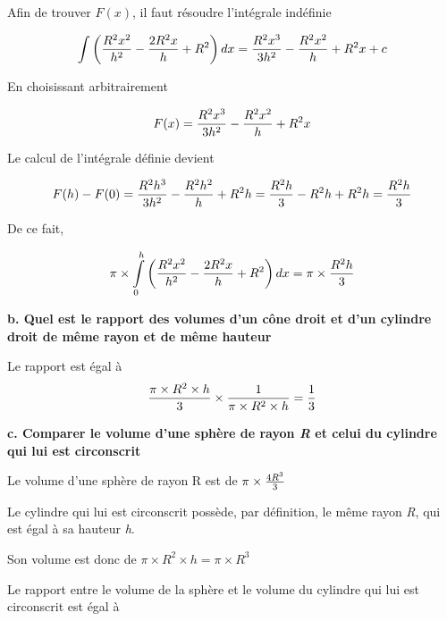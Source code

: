 \documentclass[10pt]{article}
\begin{document}
Afin de trouver $F(x)$, il faut résoudre l'intégrale indéfinie\vspace{0.2cm}

$$\int\left({R^2x^2\over{h^2}}-{2R^2x\over{h}}+R^2\right)dx={R^2x^3\over{3}h^2}-{R^2x^2\over{h}}+R^2x+c$$\vspace{0.01cm}

En choisissant arbitrairement

$$F(x)={R^2x^3\over{3}h^2}-{R^2x^2\over{h}}+R^2x$$\vspace{0.01cm}

Le calcul de l'intégrale définie devient\vspace{0.2cm}

$$F(h)-F(0)={R^2h^3\over{3}h^2}-{R^2h^2\over{h}}+R^2h={R^2h\over{3}}-R^2h+R^2h={R^2h\over{3}}$$\vspace{0.01cm}

De ce fait,

$$\pi\times\int\limits_0^h\left({R^2x^2\over{h^2}}-{2R^2x\over{h}}+R^2\right)dx=\pi\times{R^2h\over{3}}$$


\newpage
\flushleft \textbf{b. Quel est le rapport des volumes d'un cône droit et d'un cylindre droit de même rayon et de même hauteur}\vspace{0.5cm}

Le rapport est égal à $$\displaystyle{\pi \times R^2 \times h \over{3}} \times {1\over{\pi \times R^2 \times h}}={1\over{3}}$$

\flushleft \textbf{c. Comparer le volume d'une sphère de rayon \textit{R} et celui du cylindre qui lui est circonscrit}\vspace{0.5cm}

Le volume d'une sphère de rayon R est de $\pi\times{4R^3\over{3}}$\vspace{0.5cm}

Le cylindre qui lui est circonscrit possède, par définition, le même rayon \textit{R}, qui est égal à sa hauteur \textit{h}.\vspace{0.5cm}

Son volume est donc de $\pi \times R^2 \times h=\pi \times R^3$ \vspace{0.5cm}

Le rapport entre le volume de la sphère et le volume du cylindre qui lui est circonscrit est égal à
\end{document}
